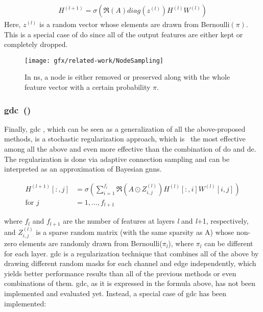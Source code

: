 \begin{align*}
    H^{(l+1)} = \sigma (\mathfrak{R}(A) diag(z^{(l)}) H^{(l)} W^{(l)})
\end{align*}
Here, $z^{(l)}$ is a random vector whose elements are drawn from Bernoulli$(\pi)$.
This is a special case of \ac{do} since all of the output features are either kept or completely dropped.
\begin{figure}[ht]
    \centering
    \texttt{[image: gfx/related-work/NodeSampling]}
    \caption{In \acf{ns}, a node is either removed or preserved along with the whole feature
        vector with a certain probability $\pi$.}\label{fig:related:NodeSampling}
\end{figure}
\subsubsection{\acl*{gdc}~(\citeauthor{Hasanzadeh2020})}
\label{sec:related:pred:regularization:gdc}
Finally, \ac{gdc} \cite{Hasanzadeh2020}, which can be seen as a generalization of all the above-proposed methods, is a stochastic regularization approach, which is~\cite{Hasanzadeh2020} the most effective among all the above and even more effective than the combination of \ac{do} and \ac{de}.
The regularization is done via adaptive connection sampling and can be interpreted as an approximation of Bayesian \acp{gnn}.

\begin{align*}
    H^{(l+1)}[:,j] & = \sigma \left(\sum_{i=1}^{f_{l}}\mathfrak{R}\left(A \odot Z_{i,j}^{(l)}\right)H^{(l)}[:,i]W^{(l)}[i,j]\right) \\
    \text{for } j  & = 1,..., f_{l+1}
\end{align*}

where $f_{l}$ and $f_{l+1}$ are the number of features at layers \textit{l} and \textit{l}+1, respectively, and
$Z_{i,j}^{(l)}$ is a sparse random matrix (with the same sparsity as A) whose non-zero
elements are randomly drawn from Bernoulli($\pi_{l}$), where $\pi_{l}$ can be different for each layer.
\Ac{gdc} is a regularization technique that combines all of the above by drawing different random masks for each channel and edge independently, which yields better performance results than all of the previous methods or even combinations of them.
\Ac{gdc}, as it is expressed in the formula above, has not been implemented and evaluated yet. Instead, a special case of \ac{gdc} has been implemented:

